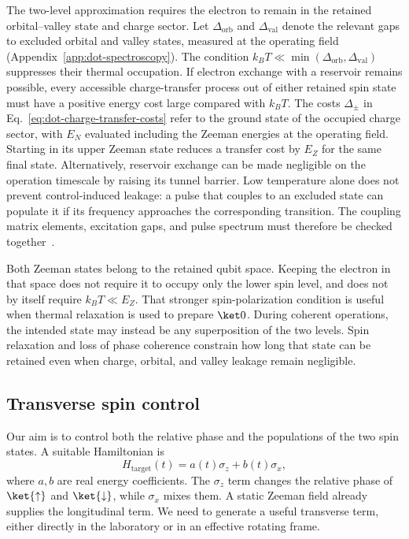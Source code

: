The two-level approximation requires the electron to remain in the
retained orbital--valley state and charge sector. Let
$\Delta_{\mathrm{orb}}$ and $\Delta_{\mathrm{val}}$ denote the
relevant gaps to excluded orbital and valley states, measured at the
operating field (Appendix~\ref{app:dot-spectroscopy}). The condition
$k_BT\ll\min(\Delta_{\mathrm{orb}},\Delta_{\mathrm{val}})$
suppresses their thermal occupation. If electron exchange with a
reservoir remains possible, every accessible charge-transfer process
out of either retained spin state must have a positive energy cost
large compared with $k_BT$. The costs $\Delta_\pm$ in
Eq.~\eqref{eq:dot-charge-transfer-costs} refer to the ground state
of the occupied charge sector, with $E_N$ evaluated including the
Zeeman energies at the operating field. Starting in its upper Zeeman state
reduces a transfer cost by $E_Z$ for the same final state.
Alternatively, reservoir exchange can be made negligible on the
operation timescale by raising its tunnel barrier. Low temperature
alone does not prevent
control-induced leakage: a pulse that couples to an excluded state
can populate it if its frequency approaches the corresponding
transition. The coupling matrix elements, excitation gaps, and
pulse spectrum must therefore be checked together~\cite{Burkard2023}.

Both Zeeman states belong to the retained qubit space. Keeping the
electron in that space does not require it to occupy only the
lower spin level, and does not by itself require $k_BT\ll E_Z$.
That stronger spin-polarization condition is useful when thermal
relaxation is used to prepare $\ket0$. During coherent operations,
the intended state may instead be any superposition of the two
levels. Spin relaxation and loss of phase coherence constrain how
long that state can be retained even when charge, orbital, and
valley leakage remain negligible.

\subsection{Transverse spin control}
\label{sec:transverse-spin-control}

Our aim is to control both the relative phase and the populations
of the two spin states. A suitable Hamiltonian is
\begin{equation}
  H_{\mathrm{target}}(t)=a(t)\sigma_z+b(t)\sigma_x,
  \label{eq:single-spin-control-target}
\end{equation}
where $a,b$ are real energy coefficients.
The $\sigma_z$ term changes the relative phase of $\ket{\uparrow}$
and $\ket{\downarrow}$, while $\sigma_x$ mixes them.
A static Zeeman field already supplies the longitudinal term.
We need to generate a useful transverse term, either directly in
the laboratory or in an effective rotating frame.

